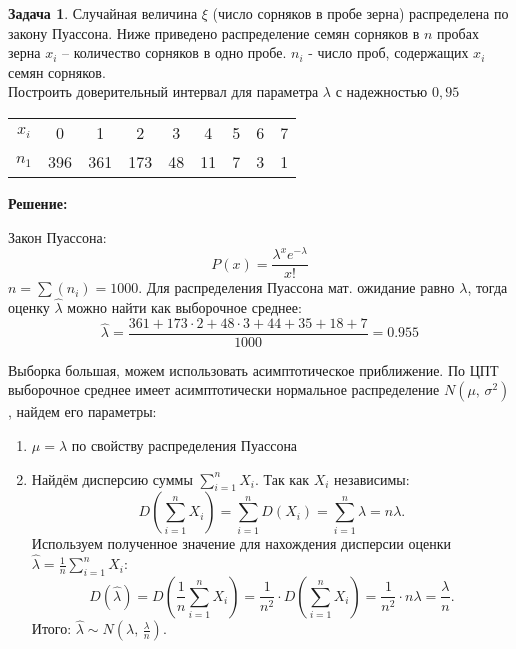 \documentclass[a4paper,11pt]{article}
\newenvironment{shdd}{\begin{mdframed}[backgroundcolor=shadecolor]}{\end{mdframed}}
\theoremstyle{definition}
\newtheorem{problem}{Задача}\setlength{\parindent}{0pt}
\newenvironment{solution}
{\begin{shdd}\textbf{Решение:}\par\setlength{\parindent}{0pt}}
{\end{shdd}}
\begin{document}
\vspace{10pt}
\begin{problem}
    Случайная величина \(\xi\) (число сорняков в пробе зерна) распределена по закону
    Пуассона.
    Ниже приведено распределение семян сорняков в \(n\) пробах зерна \(x_i\) –
    количество сорняков в одно пробе. \(n_i\) - число проб, содержащих \(x_i\) семян сорняков.
    \\Построить доверительный интервал для параметра \(\lambda\) с надежностью \(0,95\)
    \begin{table}[H]
        \centering
        \begin{adjustbox}{max width=\textwidth}
            \begin{tabular}{c c c c c c c c c}
                \toprule
                \midrule
                    \(x_i\) & 0   & 1   & 2   & 3  & 4 & 5 & 6 & 7 \\
                    \(n_1\) & 396 & 361 & 173 & 48 & 11 & 7 & 3 & 1 \\
            \bottomrule
            \end{tabular}
        \end{adjustbox}\label{tab:table}
    \end{table}  

    
    \begin{solution}
        Закон Пуассона: 
        \[
        P(x) = \frac{\lambda^x e^{-\lambda}}{x!} 
        \]
        \(n = \sum(n_i) = 1000\). Для распределения Пуассона мат. ожидание равно \(\lambda\), 
        тогда оценку \(\hat{\lambda}\) можно найти как выборочное среднее: 
        \[
        \hat{\lambda} = \frac{361 + 173\cdot2 + 48\cdot3 + 44 + 35 + 18 + 7}{1000} = 0.955
        \] 

        Выборка большая, можем использовать асимптотическое приближение. По ЦПТ выборочное среднее 
        имеет асимптотически нормальное распределение \(N(\mu,\, \sigma^2)\), найдем его параметры:
        \begin{enumerate}
            \item \(\mu = \lambda\) по свойству распределения Пуассона
            \item Найдём дисперсию суммы \( \sum_{i=1}^n X_i \). Так как \(X_i\) независимы:
            \[
            D\left(\sum_{i=1}^n X_i\right) = \sum_{i=1}^n D(X_i) = \sum_{i=1}^n \lambda = n\lambda.
            \]
            Используем полученное значение для нахождения дисперсии оценки \(\hat{\lambda} = \frac{1}{n} \sum_{i=1}^n X_i\):
            \[
            D(\hat{\lambda}) = D\left(\frac{1}{n} \sum_{i=1}^n X_i \right) 
            = \frac{1}{n^2} \cdot D\left(\sum_{i=1}^n X_i\right) 
            = \frac{1}{n^2} \cdot n\lambda = \frac{\lambda}{n}.
            \]
            Итого: \(\hat{\lambda} \sim N\left(\lambda,\, \frac{\lambda}{n}\right).\)
        \end{enumerate}


\end{solution}
\end{problem}
\end{document}
